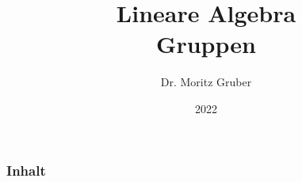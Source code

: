 

\title{Lineare Algebra\\[3mm] 
	\large Gruppen
	}
\author{Dr. Moritz Gruber} 
\date{2022}



%
\begin{frame}[plain] 
 \titlepage
\end{frame}
%
%
\begin{frame}\frametitle{Inhalt}
   \tableofcontents
\end{frame}
%
